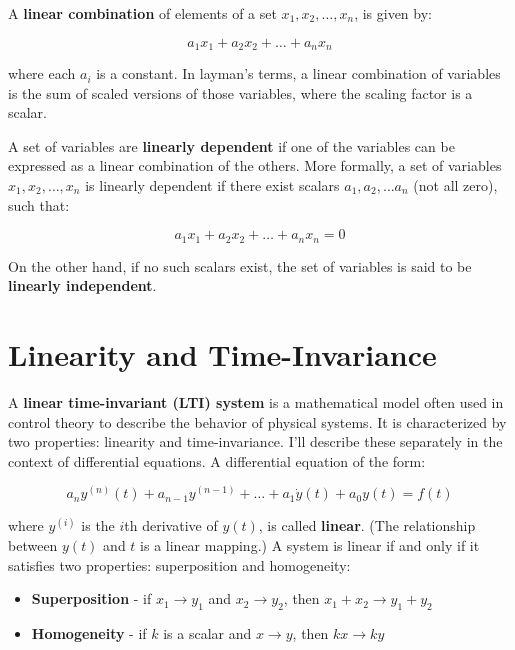 \documentclass{report}
\begin{document}
\begin{onehalfspacing}
\begin{flushleft}
\medskip

A \textbf{linear combination} of elements of a set \(x_1, x_2, \dots, x_n\), is given by:

\vspace{-0.1in}
\[a_1 x_1 + a_2 x_2 + \dots + a_n x_n \]

where each \(a_i\) is a constant. In layman's terms, a linear combination of variables is the sum of scaled versions of those variables, where the scaling factor is a scalar.

\medskip

A set of variables are \textbf{linearly dependent} if one of the variables can be expressed as a linear combination of the others. More formally, a set of variables \(x_1, x_2, \dots, x_n\) is linearly dependent if there exist scalars \(a_1, a_2, \dots a_n\) (not all zero), such that:

\vspace{-0.1in}
\[a_1 x_1 + a_2 x_2 + \dots + a_n x_n = 0\]

On the other hand, if no such scalars exist, the set of variables is said to be \textbf{linearly independent}. 

\section{Linearity and Time-Invariance}

A \textbf{linear time-invariant (LTI) system} is a mathematical model often used in control theory to describe the behavior of physical systems. It is characterized by two properties: linearity and time-invariance. I'll describe these separately in the context of differential equations. A differential equation of the form:

\vspace{-0.1in}
\[a_n y^{(n)} (t) + a_{n-1} y^{(n-1)} + \dots + a_1 \dot{y}(t) + a_0 y(t) = f(t)\]

where \(y^{(i)}\) is the \(i\)th derivative of \(y(t)\), is called \textbf{linear}. (The relationship between \(y(t)\) and \(t\) is a linear mapping.) A system is linear if and only if it satisfies two properties: superposition and homogeneity:

\begin{itemize}[noitemsep]
    \item \textbf{Superposition} - if \(x_1 \to y_1\) and \(x_2 \to y_2\), then \(x_1 + x_2 \to y_1 + y_2\)
    \item \textbf{Homogeneity} - if \(k\) is a scalar and \(x \to y\), then \(kx \to ky\)
\end{itemize}


\end{flushleft}
\end{onehalfspacing}
\end{document}

